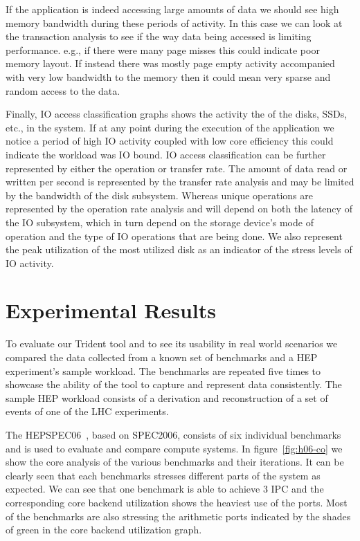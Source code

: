 \documentclass{webofc}
\begin{document}
If the application is indeed accessing large amounts of data we should see high memory bandwidth during these periods of activity. In this case we can look at the transaction analysis to see if the way data being accessed is limiting performance. e.g., if there were many page misses this could indicate poor memory layout. If instead there was mostly page empty activity accompanied with very low bandwidth to the memory then it could mean very sparse and random access to the data. 

Finally, IO access classification graphs shows the activity the of the disks, SSDs, etc., in the system. If at any point during the execution of the application we notice a period of high IO activity coupled with low core efficiency this could indicate the workload was IO bound. IO access classification can be further represented by either the operation or transfer rate. The amount of data read or written per second is represented by the transfer rate analysis and may be limited by the bandwidth of the disk subsystem. Whereas unique operations are represented by the operation rate analysis and will depend on both the latency of the IO subsystem, which in turn depend on the storage device's mode of operation and the type of IO operations that are being done. We also represent the peak utilization of the most utilized disk as an indicator of the stress levels of IO activity.

\section{Experimental Results}
\label{sec:results}

To evaluate our Trident tool and to see its usability in real world scenarios we compared the data collected from a known set of benchmarks and a HEP experiment's sample workload. The benchmarks are repeated five times to showcase the ability of the tool to capture and represent data consistently. The sample HEP workload consists of a derivation and reconstruction of a set of events of one of the LHC experiments.

The HEPSPEC06~\cite{}, based on SPEC2006, consists of six individual benchmarks and is used to evaluate and compare compute systems. In figure~\ref{fig:h06-co} we show the core analysis of the various benchmarks and their iterations. It can be clearly seen that each benchmarks stresses different parts of the system as expected. We can see that one benchmark is able to achieve 3 IPC and the corresponding core backend utilization shows the heaviest use of the ports. Most of the benchmarks are also stressing the arithmetic ports indicated by the shades of green in the core backend utilization graph.
\end{document}
